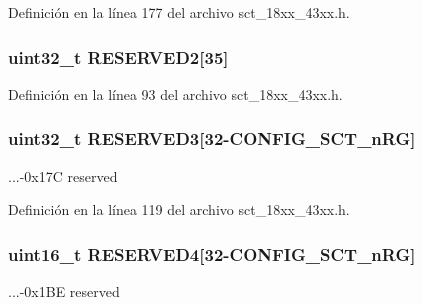 Definición en la línea 177 del archivo sct\+\_\+18xx\+\_\+43xx.\+h.

\subsubsection[{\texorpdfstring{R\+E\+S\+E\+R\+V\+E\+D2}{RESERVED2}}]{\setlength{\rightskip}{0pt plus 5cm}uint32\+\_\+t R\+E\+S\+E\+R\+V\+E\+D2\mbox{[}35\mbox{]}}\hypertarget{struct_l_p_c___s_c_t___t_a17c0650223da9da2af6dd44741397943}{}\label{struct_l_p_c___s_c_t___t_a17c0650223da9da2af6dd44741397943}


Definición en la línea 93 del archivo sct\+\_\+18xx\+\_\+43xx.\+h.

\subsubsection[{\texorpdfstring{R\+E\+S\+E\+R\+V\+E\+D3}{RESERVED3}}]{\setlength{\rightskip}{0pt plus 5cm}uint32\+\_\+t R\+E\+S\+E\+R\+V\+E\+D3\mbox{[}32-\/{\bf C\+O\+N\+F\+I\+G\+\_\+\+S\+C\+T\+\_\+n\+RG}\mbox{]}}\hypertarget{struct_l_p_c___s_c_t___t_a9e45447d2ebd831c7c0c5ef2d9428abf}{}\label{struct_l_p_c___s_c_t___t_a9e45447d2ebd831c7c0c5ef2d9428abf}
...-\/0x17C reserved 

Definición en la línea 119 del archivo sct\+\_\+18xx\+\_\+43xx.\+h.

\subsubsection[{\texorpdfstring{R\+E\+S\+E\+R\+V\+E\+D4}{RESERVED4}}]{\setlength{\rightskip}{0pt plus 5cm}uint16\+\_\+t R\+E\+S\+E\+R\+V\+E\+D4\mbox{[}32-\/{\bf C\+O\+N\+F\+I\+G\+\_\+\+S\+C\+T\+\_\+n\+RG}\mbox{]}}\hypertarget{struct_l_p_c___s_c_t___t_affca949c40794389e0513a7bb1048344}{}\label{struct_l_p_c___s_c_t___t_affca949c40794389e0513a7bb1048344}
...-\/0x1\+BE reserved 

